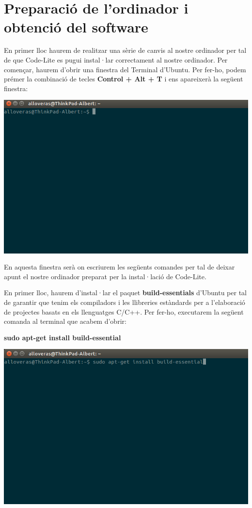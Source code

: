 \documentclass[11pt]{article}
\begin{document}
\section{Preparació de l'ordinador i obtenció del software}
\noindent En primer lloc haurem de realitzar una sèrie de canvis al nostre ordinador per tal de que Code-Lite es pugui instal·lar correctament al nostre ordinador. Per començar, haurem d'obrir una finestra del Terminal d'Ubuntu. Per fer-ho, podem prémer la combinació de tecles \textbf{Control + Alt + T} i ens apareixerà la següent finestra:

\begin{center}
	\includegraphics[scale=0.4]{img/Ubuntu_Terminal_Screen.png}
\end{center}

\noindent En aquesta finestra serà on escriurem les següents comandes per tal de deixar apunt el nostre ordinador preparat per la instal·lació de Code-Lite.\pagebreak

\noindent En primer lloc, haurem d'instal·lar el paquet \textbf{build-essentials} d'Ubuntu per tal de garantir que tenim els compiladors i les llibreries estàndards per a l'elaboració de projectes basats en els llenguatges C/C++. Per fer-ho, executarem la següent comanda al terminal que acabem d'obrir:

\begin{center}
	\textbf{sudo apt-get install build-essential}
\end{center}

\begin{center}
	\includegraphics[scale=0.4]{img/Build_Essential_Install.png}
\end{center}
\end{document}
